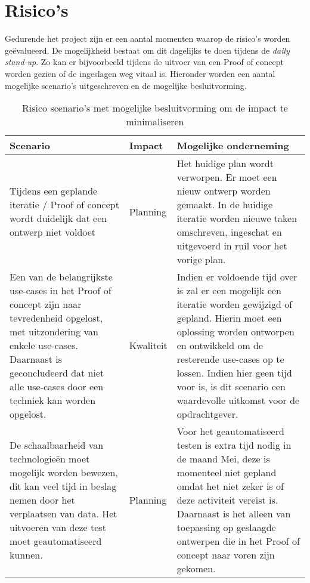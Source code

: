 \newpage

\section{Risico's} %

Gedurende het project zijn er een aantal momenten waarop de risico’s worden geëvalueerd. De mogelijkheid bestaat om dit dagelijks te doen tijdens de \textit{daily stand-up}. Zo kan er bijvoorbeeld tijdens de uitvoer van een Proof of concept worden gezien of de ingeslagen weg vitaal is.
Hieronder worden een aantal mogelijke scenario's uitgeschreven en de mogelijke besluitvorming.

\begin{table}[h!]
\centering
\caption{Risico scenario's met mogelijke besluitvorming om de impact te minimaliseren}
\label{tab:risks}
\def\arraystretch{1.5}
\begin{tabular}{|p{5cm}|l|p{8cm}|}
\hline
Scenario & Impact & Mogelijke onderneming \\ \hline
    Tijdens een geplande iteratie / Proof of concept wordt duidelijk dat een ontwerp niet voldoet
    & Planning 
    & Het huidige plan wordt verworpen. Er moet een nieuw ontwerp worden gemaakt. In de huidige iteratie worden nieuwe taken omschreven, ingeschat en uitgevoerd in ruil voor het vorige plan. \\
\hline
    Een van de belangrijkste use-cases in het Proof of concept zijn naar tevredenheid opgelost, met uitzondering van enkele use-cases. Daarnaast is geconcludeerd dat niet alle use-cases door een techniek kan worden opgelost.
    & Kwaliteit
    & Indien er voldoende tijd over is zal er een mogelijk een iteratie worden gewijzigd of gepland. Hierin moet een oplossing worden ontworpen en ontwikkeld om de resterende use-cases op te lossen. Indien hier geen tijd voor is, is dit scenario een waardevolle uitkomst voor de opdrachtgever. \\
\hline
    De schaalbaarheid van technologieën moet mogelijk worden bewezen, dit kan veel tijd in beslag nemen door het verplaatsen van data. Het uitvoeren van deze test moet geautomatiseerd kunnen.
    & Planning
    & Voor het geautomatiseerd testen is extra tijd nodig in de maand Mei, deze is momenteel niet gepland omdat het niet zeker is of deze activiteit vereist is. Daarnaast is het alleen van toepassing op geslaagde ontwerpen die in het Proof of concept naar voren zijn gekomen. \\
\hline
\end{tabular}
\end{table}

